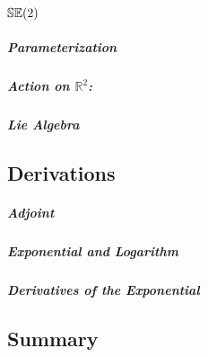 \chapter{${\mathbb{SE}(2)}$}

\paragraph{Parameterization}

\paragraph{Action on $\mathbb{R}^2$:}

\paragraph{Lie Algebra}

\section{Derivations}

\paragraph{Adjoint}

\paragraph{Exponential and Logarithm}

\paragraph{Derivatives of the Exponential}

\section{Summary}

